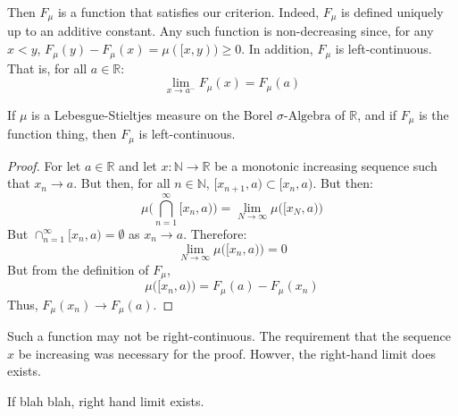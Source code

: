             Then $F_{\mu}$ is a function that satisfies our criterion.
            Indeed, $F_{\mu}$ is defined uniquely up to an additive
            constant. Any such function is non-decreasing since, for
            any $x<y$, $F_{\mu}(y)-F_{\mu}(x)=\mu([x,y))\geq{0}$.
            In addition, $F_{\mu}$ is left-continuous. That is,
            for all $a\in\mathbb{R}$:
            \begin{equation}
                \underset{x\rightarrow{a}^{-}}{\lim}F_{\mu}(x)
                =F_{\mu}(a)
            \end{equation}
            \begin{theorem}
                If $\mu$ is a Lebesgue-Stieltjes measure on the
                Borel $\sigma\text{-Algebra}$ of $\mathbb{R}$, and if
                $F_{\mu}$ is the function thing, then $F_{\mu}$ is
                left-continuous.
            \end{theorem}
            \begin{proof}
                For let $a\in\mathbb{R}$ and let
                $x:\mathbb{N}\rightarrow\mathbb{R}$ be a monotonic
                increasing sequence such that $x_{n}\rightarrow{a}$.
                But then, for all $n\in\mathbb{N}$,
                $[x_{n+1},a)\subset[x_{n},a)$. But then:
                \begin{equation}
                    \mu\Big(\bigcap_{n=1}^{\infty}[x_{n},a)\Big)
                    =\underset{N\rightarrow\infty}{\lim}
                    \mu\big([x_{N},a)\big)
                \end{equation}
                But $\cap_{n=1}^{\infty}[x_{n},a)=\emptyset$ as
                $x_{n}\rightarrow{a}$. Therefore:
                \begin{equation}
                    \underset{N\rightarrow\infty}{\lim}
                    \mu\big([x_{n},a)\big)=0
                \end{equation}
                But from the definition of $F_{\mu}$,
                \begin{equation}
                    \mu\big([x_{n},a)\big)=F_{\mu}(a)-F_{\mu}(x_{n})
                \end{equation}
                Thus, $F_{\mu}(x_{n})\rightarrow{F}_{\mu}(a)$.
            \end{proof}
            Such a function may not be right-continuous. The requirement
            that the sequence $x$ be increasing was necessary for the
            proof. Howver, the right-hand limit does exists.
            \begin{theorem}
                If blah blah, right hand limit exists.
            \end{theorem}

